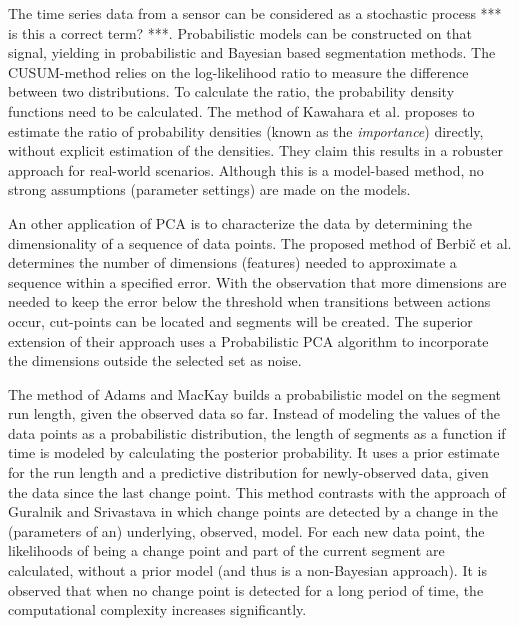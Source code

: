 The time series data from a sensor can be considered as a stochastic process *** is this a correct term? ***.
Probabilistic models can be constructed on that signal, yielding in probabilistic and Bayesian based segmentation methods.
The CUSUM-method relies on the log-likelihood ratio to measure the difference between two distributions.
To calculate the ratio, the probability density functions need to be calculated.
The method of Kawahara et al. \cite{kawahara2009change} proposes to estimate the ratio of probability densities (known as the \emph{importance}) directly, without explicit estimation of the densities.
They claim this results in a robuster approach for real-world scenarios.
Although this is a model-based method, no strong assumptions (parameter settings) are made on the models.

An other application of PCA is to characterize the data by determining the dimensionality of a sequence of data points.
The proposed method of Berbi\v{c} et al. \cite{barbivc2004segmenting} determines the number of dimensions (features) needed to approximate a sequence within a specified error.
With the observation that more dimensions are needed to keep the error below the threshold when transitions between actions occur, cut-points can be located and segments will be created.
The superior extension of their approach uses a Probabilistic PCA algorithm to incorporate the dimensions outside the selected set as noise.

The method of Adams and MacKay \cite{adams2007bayesian} builds a probabilistic model on the segment run length, given the observed data so far.
Instead of modeling the values of the data points as a probabilistic distribution, the length of segments as a function if time is modeled by calculating the posterior probability.
It uses a prior estimate for the run length and a predictive distribution for newly-observed data, given the data since the last change point.
This method contrasts with the approach of Guralnik and Srivastava \cite{guralnik1999event} in which change points are detected by a change in the (parameters of an) underlying, observed, model.
For each new data point, the likelihoods of being a change point and part of the current segment are calculated, without a prior model (and thus is a non-Bayesian approach).
It is observed that when no change point is detected for a long period of time, the computational complexity increases significantly.